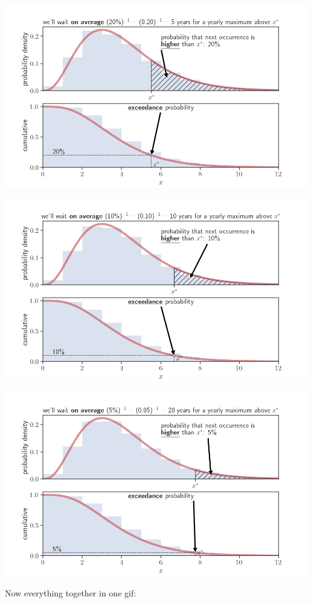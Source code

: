 \documentclass[
  letterpaper,
  DIV=11,
  numbers=noendperiod]{scrreprt}
\begin{document}
\includegraphics{archive/figures/return_prob_020.png}

\includegraphics{archive/figures/return_prob_010.png}

\includegraphics{archive/figures/return_prob_005.png}

Now everything together in one gif:
\end{document}
